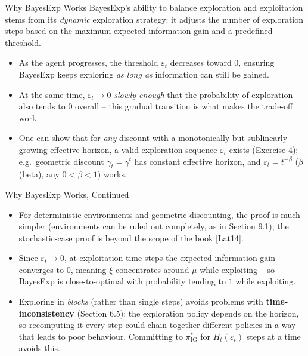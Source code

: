 \documentclass[aspectratio=169,10pt]{beamer}
\newcommand{\IG}{\mathrm{IG}}
\begin{document}
\begin{frame}{Why BayesExp Works}
  BayesExp's ability to balance exploration and exploitation stems from its
  \emph{dynamic} exploration strategy: it adjusts the number of exploration
  steps based on the maximum expected information gain and a predefined
  threshold.

  \begin{itemize}
    \item As the agent progresses, the threshold $\varepsilon_t$ decreases
      toward $0$, ensuring BayesExp keeps exploring \emph{as long as}
      information can still be gained.
    \item At the same time, $\varepsilon_t\to0$ \emph{slowly enough} that
      the probability of exploration also tends to $0$ overall -- this
      gradual transition is what makes the trade-off work.
    \item One can show that for \emph{any} discount with a monotonically
      but sublinearly growing effective horizon, a valid exploration
      sequence $\varepsilon_t$ exists (Exercise 4); e.g.\ geometric
      discount $\gamma_t=\gamma^t$ has constant effective horizon, and
      $\varepsilon_t=t^{-\beta}$ ($\beta$ (beta), any $0<\beta<1$) works.
  \end{itemize}
\end{frame}

\begin{frame}{Why BayesExp Works, Continued}
  \begin{itemize}
    \item For deterministic environments and geometric discounting, the
      proof is much simpler (environments can be ruled out completely, as
      in Section 9.1); the stochastic-case proof is beyond the scope of
      the book [Lat14].
    \item Since $\varepsilon_t\to0$, at exploitation time-steps the
      expected information gain converges to $0$, meaning $\xi$
      concentrates around $\mu$ while exploiting -- so BayesExp is
      close-to-optimal with probability tending to $1$ while exploiting.
    \item Exploring in \emph{blocks} (rather than single steps) avoids
      problems with \textbf{time-inconsistency} (Section 6.5): the
      exploration policy depends on the horizon, so recomputing it every
      step could chain together different policies in a way that leads to
      poor behaviour. Committing to $\pi^*_{\IG}$ for $H_t(\varepsilon_t)$
      steps at a time avoids this.
  \end{itemize}
\end{frame}
\end{document}
